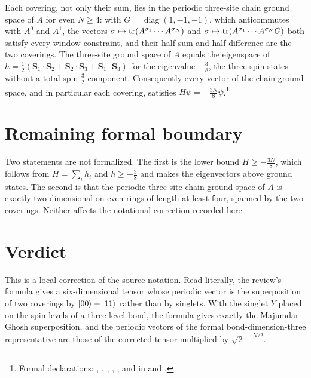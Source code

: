 \documentclass{article}
\begin{document}
Each covering, not only their sum, lies in the periodic three-site chain
ground space of $A$ for even $N\ge4$: with $G=\operatorname{diag}(1,-1,-1)$,
which anticommutes with $A^0$ and $A^1$, the vectors
$\sigma\mapsto\operatorname{tr}(A^{\sigma_1}\cdots A^{\sigma_N})$ and
$\sigma\mapsto\operatorname{tr}(A^{\sigma_1}\cdots A^{\sigma_N}G)$ both satisfy every window
constraint, and their half-sum and half-difference are the two coverings. The
three-site ground space of $A$ equals the eigenspace of
$h=\tfrac12(\mathbf S_1\cdot\mathbf S_2+\mathbf S_2\cdot\mathbf S_3
+\mathbf S_1\cdot\mathbf S_3)$ for the eigenvalue $-\tfrac38$, the three-spin
states without a total-spin-$\tfrac32$ component. Consequently every vector of
the chain ground space, and in particular each covering, satisfies
$H\psi=-\tfrac{3N}{8}\psi$.\footnote{Formal declarations:
,
,
,
,
, and
 in
 and
.}

\section{Remaining formal boundary}

Two statements are not formalized. The first is the lower bound
$H\ge-\tfrac{3N}{8}$, which follows from
$H=\sum_i h_i$ and $h\ge-\tfrac38$ and makes the eigenvectors above ground
states. The second is that the periodic three-site chain ground space of $A$
is exactly two-dimensional on even rings of length at least four, spanned by
the two coverings. Neither affects the notational correction recorded here.

\section{Verdict}

This is a local correction of the source notation. Read literally, the
review's formula gives a six-dimensional tensor whose periodic vector is the
superposition of two coverings by $|00\rangle+|11\rangle$ rather than by singlets.
With the singlet $Y$ placed on the spin levels of a three-level bond, the
formula gives exactly the Majumdar--Ghosh superposition, and the periodic
vectors of the formal bond-dimension-three representative are those of the
corrected tensor multiplied by $\sqrt2^{\,-N/2}$.



\end{document}
